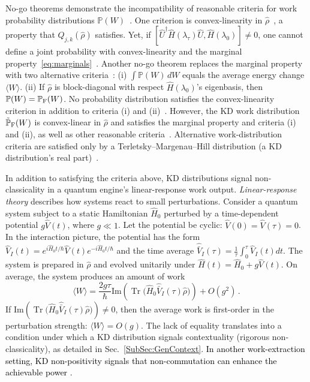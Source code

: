 \documentclass[%
 reprint,
superscriptaddress,
nofootinbib,
bibnotes,
 amsmath,amssymb,
 aps,
]{revtex4-1}
\theoremstyle{plain}
\DeclareMathOperator{\Tr}{Tr}
\newcommand{\Dave}[1]{\textcolor{black}{#1} }
\begin{document}
No-go theorems demonstrate 
the incompatibility of reasonable criteria for work probability distributions $\mathbb{P}(W)$~\cite{Perarnau-Llobet_no-go_2017, Hernandez-Gomez_projective_2022, Lostaglio_kirkwood_2022}.  
One criterion is convex-linearity in $\hat{\rho}$~\cite{Perarnau-Llobet_no-go_2017, Lostaglio_quantum_2018, Lostaglio_kirkwood_2022},
a property that $Q_{j,k}(\hat{\rho})$ satisfies.
Yet, if $[\hat{U}^\dag \hat{H}(\lambda_\tau) \hat{U},  \hat{H}(\lambda_0)]  \neq 0$, one cannot define a joint probability with convex-linearity and the marginal property~\eqref{eq:marginals}~\cite{Hernandez-Gomez_projective_2022}. Another no-go theorem replaces the marginal property with two alternative criteria~\cite{Perarnau-Llobet_no-go_2017}: (i) $\int  \mathbb{P}(W) \, dW$ equals the average energy change $\langle W \rangle$. (ii)
If $\hat{\rho}$ is block-diagonal with respect $\hat{H}(\lambda_0)$'s eigenbasis, then
$\mathbb{P}(W) = \mathbb{P}_{\rm F}(W)$.
No probability distribution satisfies the convex-linearity criterion in addition to criteria (i) and (ii)~\cite{Perarnau-Llobet_no-go_2017}.
However, the KD work distribution $\tilde{\mathbb{P}}_{\rm F}(W)$ 
is convex-linear in $\hat{\rho}$ and satisfies the marginal property and criteria (i) and (ii), as well as other reasonable criteria~\cite{Pei_exploring_2023}.
Alternative work-distribution criteria are satisfied only by a Terletsky--Margenau--Hill
distribution (a KD distribution's real part)~\cite{francica_most_2022, Pei_exploring_2023}.




In addition to satisfying the criteria above, KD distributions signal non-classicality in a quantum engine's linear-response work output.
\emph{Linear-response theory} describes how systems react
to small perturbations.
Consider a quantum system subject to
a static Hamiltonian $\hat{H}_0$ perturbed by a time-dependent potential $g \hat{V}(t)$, where $g \ll 1$.
Let the potential be cyclic: $\hat{V}(0) = \hat{V}(\tau) = 0$. 
In the interaction picture, the potential has the form $\hat{V}_I(t) = e^{i \hat{H}_0 t/\hbar} \hat{V}(t) e^{-i \hat{H}_0 t/\hbar}$ and the time average $ \hat{\bar{V}}_I(\tau)= \frac{1}{\tau}\int_{0}^\tau \hat{V}_I(t) dt$.
The system is prepared in $\hat{\rho}$ and evolved unitarily under $\hat{H}(t) = \hat{H}_0 + g \hat{V}(t)$. 
On average, the system produces an amount of work~\cite{Lostaglio_certifying_2020}
\begin{equation}
    \langle W \rangle = \frac{2 g \tau }{\hbar} \mathrm{Im}\left( \Tr\bm{(}\hat{H}_0 \hat{\bar{V}}_I(\tau) \hat{\rho} \bm{)}\right) + O\left(g^2\right)\,.
\end{equation}
If $\mathrm{Im}\left( \Tr\bm{(}\hat{H}_0 \hat{\bar{V}}_I (\tau) \hat{\rho} \bm{)}\right) \neq 0$, then the average work is first-order in the perturbation strength: $\langle W \rangle = O(g)$.
The lack of equality translates into a condition under which a KD distribution  signals contextuality (rigorous non-classicality), as detailed in Sec.~\ref{SubSec:GenContext}.  \Dave{In another work-extraction setting,  KD non-positivity signals that non-commutation can enhance the achievable power  \cite{pratapsi2024quantum}.}
\end{document}
